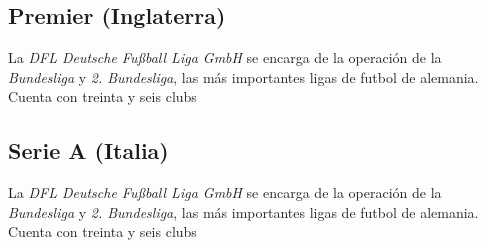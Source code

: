 \subsection{Premier (Inglaterra)}

La \emph{DFL Deutsche Fußball Liga GmbH} se encarga de la operación de la \emph{Bundesliga} y \emph{2. Bundesliga}, las más importantes ligas de futbol de alemania. Cuenta con treinta y seis clubs 


\subsection{Serie A (Italia)}

La \emph{DFL Deutsche Fußball Liga GmbH} se encarga de la operación de la \emph{Bundesliga} y \emph{2. Bundesliga}, las más importantes ligas de futbol de alemania. Cuenta con treinta y seis clubs 





